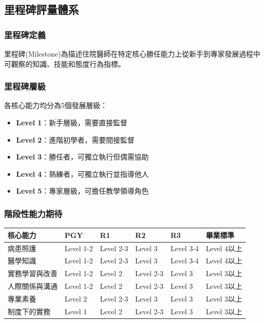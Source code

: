 \documentclass[12pt,a4paper]{article}
\begin{document}
\subsection{里程碑評量體系}
\subsubsection{里程碑定義}
里程碑(Milestone)為描述住院醫師在特定核心勝任能力上從新手到專家發展過程中可觀察的知識、技能和態度行為指標。
\subsubsection{里程碑層級}
各核心能力均分為5個發展層級：
\begin{itemize}[nosep]
    \item \textbf{Level 1}：新手層級，需要直接監督
    \item \textbf{Level 2}：進階初學者，需要間接監督
    \item \textbf{Level 3}：勝任者，可獨立執行但偶需協助
    \item \textbf{Level 4}：熟練者，可獨立執行並指導他人
    \item \textbf{Level 5}：專家層級，可擔任教學領導角色
\end{itemize}
\subsubsection{階段性能力期待}
\begin{longtable}{|>{\raggedright\arraybackslash}p{3cm}|>{\raggedright\arraybackslash}p{2cm}|>{\raggedright\arraybackslash}p{2cm}|>{\raggedright\arraybackslash}p{2cm}|>{\raggedright\arraybackslash}p{2cm}|>{\raggedright\arraybackslash}p{2cm}|}
\hline
\rowcolor{light_green}
\textbf{核心能力} & \textbf{PGY} & \textbf{R1} & \textbf{R2} & \textbf{R3} & \textbf{畢業標準} \\
\hline
病患照護 & Level 1-2 & Level 2-3 & Level 3 & Level 3-4 & Level 4以上 \\
\hline
醫學知識 & Level 1-2 & Level 2-3 & Level 3 & Level 3-4 & Level 4以上 \\
\hline
實務學習與改善 & Level 1-2 & Level 2 & Level 2-3 & Level 3 & Level 3以上 \\
\hline
人際關係與溝通 & Level 1-2 & Level 2 & Level 2-3 & Level 3 & Level 3以上 \\
\hline
專業素養 & Level 2 & Level 2-3 & Level 3 & Level 3 & Level 3以上 \\
\hline
制度下的實務 & Level 1 & Level 2 & Level 2-3 & Level 3 & Level 3以上 \\
\hline
\end{longtable}
\end{document}
